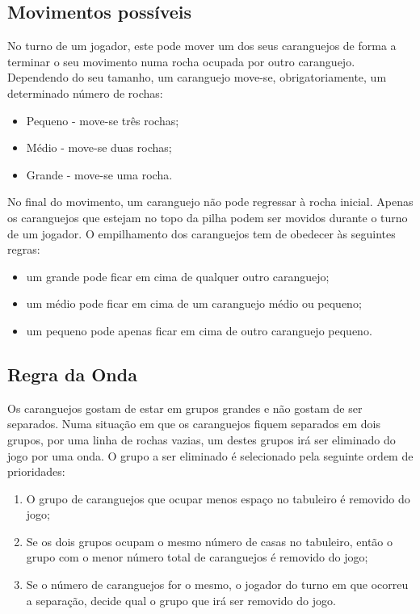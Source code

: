 \documentclass[a4paper]{article}
\begin{document}
\subsection{Movimentos possíveis} \label{movimentos_caranguejo}

No turno de um jogador, este pode mover um dos seus caranguejos de forma a terminar o seu movimento numa rocha ocupada por outro caranguejo. Dependendo do seu tamanho, um caranguejo move-se, obrigatoriamente, um determinado número de rochas:
\begin{itemize}
\item Pequeno - move-se três rochas;
\item Médio - move-se duas rochas;
\item Grande - move-se uma rocha.
\end{itemize}
No final do movimento, um caranguejo não pode regressar à rocha inicial.
\newline
Apenas os caranguejos que estejam no topo da pilha podem ser movidos durante o turno de um jogador.
\newline
O empilhamento dos caranguejos tem de obedecer às seguintes regras:
\begin{itemize}
\item um grande pode ficar em cima de qualquer outro caranguejo;
\item um médio pode ficar em cima de um caranguejo médio ou pequeno;
\item um pequeno pode apenas ficar em cima de outro caranguejo pequeno.
\end{itemize}

\subsection{Regra da Onda}
Os caranguejos gostam de estar em grupos grandes e não gostam de ser separados. Numa situação em que os caranguejos fiquem separados em dois grupos, por uma linha de rochas vazias, um destes grupos irá ser eliminado do jogo por uma onda. O grupo a ser eliminado é selecionado pela seguinte ordem de prioridades:
\begin{enumerate}
\item O grupo de caranguejos que ocupar menos espaço no tabuleiro é removido do jogo;
\item Se os dois grupos ocupam o mesmo número de casas no tabuleiro, então o grupo com o menor número total de caranguejos é removido do jogo;
\item Se o número de caranguejos for o mesmo, o jogador do turno em que ocorreu a separação, decide qual o grupo que irá ser removido do jogo.
\end{enumerate}
\end{document}
